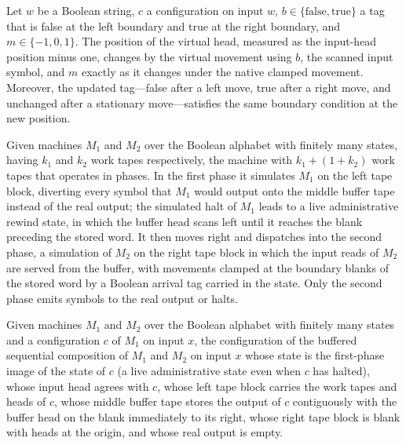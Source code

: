 \begin{lemma}
\label{Turing.FinTM.virtualMove_correct}
\leanok
{}
Let $w$ be a Boolean string, $c$ a configuration on input $w$,
$b\in\{\mathrm{false},\mathrm{true}\}$ a tag that is false at the left boundary and true
at the right boundary, and $m\in\{-1,0,1\}$. The position of the virtual head, measured
as the input-head position minus one, changes by the virtual movement using $b$, the
scanned input symbol, and $m$ exactly as it changes under the native clamped movement.
Moreover, the updated tag—false after a left move, true after a right move, and
unchanged after a stationary move—satisfies the same boundary condition at the new
position.
\end{lemma}

\begin{definition}
\label{Turing.FinTM.bufferedCompTM}
\leanok
{}
Given machines $M_1$ and $M_2$ over the Boolean alphabet with finitely many
states, having $k_1$ and $k_2$ work tapes respectively, the machine with
$k_1 + (1 + k_2)$ work tapes that operates in phases.  In the first phase it
simulates $M_1$ on the left tape block, diverting every symbol that $M_1$
would output onto the middle buffer tape instead of the real output; the
simulated halt of $M_1$ leads to a live administrative rewind state, in which
the buffer head scans left until it reaches the blank preceding the stored
word.  It then moves right and dispatches into the second phase, a simulation
of $M_2$ on the right tape block in which the input reads of $M_2$ are served
from the buffer, with movements clamped at the boundary blanks of the stored
word by a Boolean arrival tag carried in the state.  Only the second phase
emits symbols to the real output or halts.
\end{definition}

\begin{definition}
\label{Turing.FinTM.bufferedFirstCfg}
\leanok
{}
Given machines $M_1$ and $M_2$ over the Boolean alphabet with finitely many
states and a configuration $c$ of $M_1$ on input $x$, the configuration of
the buffered sequential composition of $M_1$ and $M_2$ on input $x$ whose
state is the first-phase image of the state of $c$ (a live administrative
state even when $c$ has halted), whose input head agrees with $c$, whose left
tape block carries the work tapes and heads of $c$, whose middle buffer tape
stores the output of $c$ contiguously with the buffer head on the blank
immediately to its right, whose right tape block is blank with heads at the
origin, and whose real output is empty.
\end{definition}

